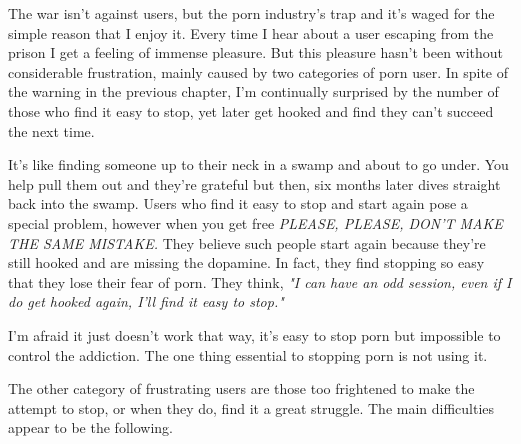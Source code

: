 \documentclass[easypeasy.tex]{subfiles}
\begin{document}
The war isn't against users, but the porn industry's trap and it's waged for the simple reason that I enjoy it. Every time I hear about a user escaping from the prison I get a feeling of immense pleasure. But this pleasure hasn't been without considerable frustration, mainly caused by two categories of porn user. In spite of the warning in the previous chapter, I'm continually surprised by the number of those who find it easy to stop, yet later get hooked and find they can't succeed the next time.

It's like finding someone up to their neck in a swamp and about to go under. You help pull them out and they're grateful but then, six months later dives straight back into the swamp. Users who find it easy to stop and start again pose a special problem, however when you get free \textit{PLEASE, PLEASE, DON'T MAKE THE SAME MISTAKE.} They believe such people start again because they're still hooked and are missing the dopamine. In fact, they find stopping so easy that they lose their fear of porn. They think, \textit{"I can have an odd session, even if I do get hooked again, I'll find it easy to stop."}

I'm afraid it just doesn't work that way, it's easy to stop porn but impossible to control the addiction. The one thing essential to stopping porn is not using it.

The other category of frustrating users are those too frightened to make the attempt to stop, or when they do, find it a great struggle. The main difficulties appear to be the following.
\end{document}
